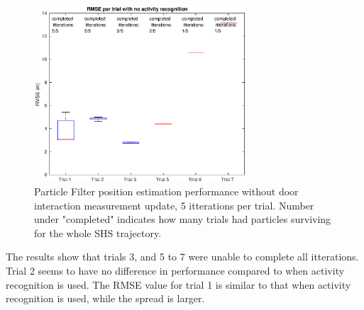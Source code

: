 \begin{figure}[H]
	\centering
	\includegraphics[width=0.7\textwidth]{images/20201118_1507_RMSE_per_trial_with_no_activity_recognition}
	\caption[Particle Filter position estimation performance without door interaction]{Particle Filter position estimation performance without door interaction measurement update, 5 itterations per trial. Number under "completed" indicates how many trials had particles surviving for the whole SHS trajectory.}
	\label{fig:pf_boxplot_no_doors}
\end{figure}

The results show that trials 3, and 5 to 7 were unable to complete all itterations. Trial 2 seems to have no difference in performance compared to when activity recognition is used. The RMSE value for trial 1 is similar to that when activity recognition is used, while the spread is larger.

